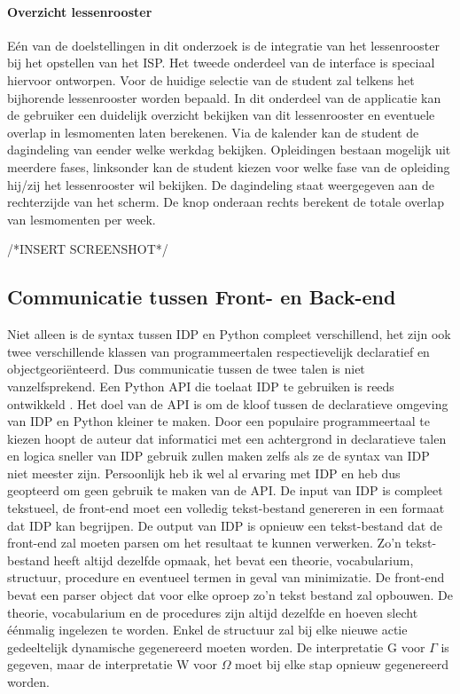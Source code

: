 \paragraph{Overzicht lessenrooster} 
E\'{e}n van de doelstellingen in dit onderzoek is de integratie van het lessenrooster bij het opstellen van het ISP. Het tweede onderdeel van de interface is speciaal hiervoor ontworpen. Voor de huidige selectie van de student zal telkens het bijhorende lessenrooster worden bepaald. In dit onderdeel van de applicatie kan de gebruiker een duidelijk overzicht bekijken van dit lessenrooster en eventuele overlap in lesmomenten laten berekenen. Via de kalender kan de student de dagindeling van eender welke werkdag bekijken. Opleidingen bestaan mogelijk uit meerdere fases, linksonder kan de student kiezen voor welke fase van de opleiding hij/zij het lessenrooster wil bekijken. De dagindeling staat weergegeven aan de rechterzijde van het scherm. De knop onderaan rechts berekent de totale overlap van lesmomenten per week.

/*INSERT SCREENSHOT*/


\subsection{Communicatie tussen Front- en Back-end}
Niet alleen is de syntax tussen IDP en Python compleet verschillend, het zijn ook twee verschillende klassen van programmeertalen respectievelijk declaratief en objectgeori\"{e}nteerd. Dus communicatie tussen de twee talen is niet vanzelfsprekend. Een Python API die toelaat IDP te gebruiken is reeds ontwikkeld \citep{vennekens2015lowering}. Het doel van de API is om de kloof tussen de declaratieve omgeving van IDP en Python kleiner te maken. Door een populaire programmeertaal te kiezen hoopt de auteur dat informatici met een achtergrond in declaratieve talen en logica sneller van IDP gebruik zullen maken zelfs als ze de syntax van IDP niet meester zijn. Persoonlijk heb ik wel al ervaring met IDP en heb dus geopteerd om geen gebruik te maken van de API. De input van IDP is compleet tekstueel, de front-end moet een volledig tekst-bestand genereren in een formaat dat IDP kan begrijpen. De output van IDP is opnieuw een tekst-bestand dat de front-end zal moeten parsen om het resultaat te kunnen verwerken. Zo'n tekst-bestand heeft altijd dezelfde opmaak, het bevat een theorie, vocabularium, structuur, procedure en eventueel termen in geval van minimizatie. De front-end bevat een parser object dat voor elke oproep zo'n tekst bestand zal opbouwen. De theorie, vocabularium en de procedures zijn altijd dezelfde en hoeven slecht \'{e}\'{e}nmalig ingelezen te worden. Enkel de structuur zal bij elke nieuwe actie gedeeltelijk dynamische gegenereerd moeten worden. De interpretatie G voor $\Gamma$ is gegeven, maar de interpretatie W voor $\Omega$ moet bij elke stap opnieuw gegenereerd worden.
